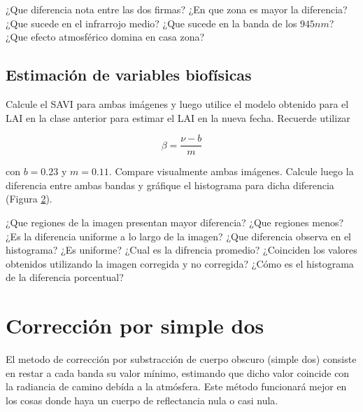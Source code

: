 \begin{figure}[h!]
    \centering
    \caption{}
    \label{fig:firmas}
\end{figure}

\begin{que}
    ¿Que diferencia nota entre las dos firmas? ¿En que zona es mayor la diferencia? ¿Que sucede en el infrarrojo medio? ¿Que sucede en la banda de los $945nm$? ¿Que efecto atmosférico domina en casa zona?
\end{que}

\subsection{Estimación de variables biofísicas}

Calcule el SAVI para ambas imágenes y luego utilice el modelo obtenido para el LAI en la clase anterior para estimar el LAI en la nueva fecha. Recuerde utilizar

\begin{equation}
    \beta = \frac{\nu - b}{m}
\end{equation}

con $b = 0.23$ y $m=0.11$. Compare visualmente ambas imágenes. Calcule luego la diferencia entre ambas bandas y gráfique el histograma para dicha diferencia (Figura \ref{fig:hist}).

\begin{figure}[h!]
    \centering
    \caption{}
    \label{fig:hist}
\end{figure}

\begin{que}
    ¿Que regiones de la imagen presentan mayor diferencia? ¿Que regiones menos? ¿Es la diferencia uniforme a lo largo de la imagen? ¿Que diferencia observa en el histograma? ¿Es uniforme? ¿Cual es la difrencia promedio? ¿Coinciden los valores obtenidos utilizando la imagen corregida y no corregida? ¿Cómo es el histograma de la diferencia porcentual?
\end{que}

\section{Corrección por simple dos}

El metodo de corrección por substracción de cuerpo obscuro (simple dos) consiste en restar a cada banda su valor mínimo, estimando que dicho valor coincide con la radiancia de camino debída a la atmósfera. Este método funcionará mejor en los cosas donde haya un cuerpo de reflectancia nula o casi nula.

